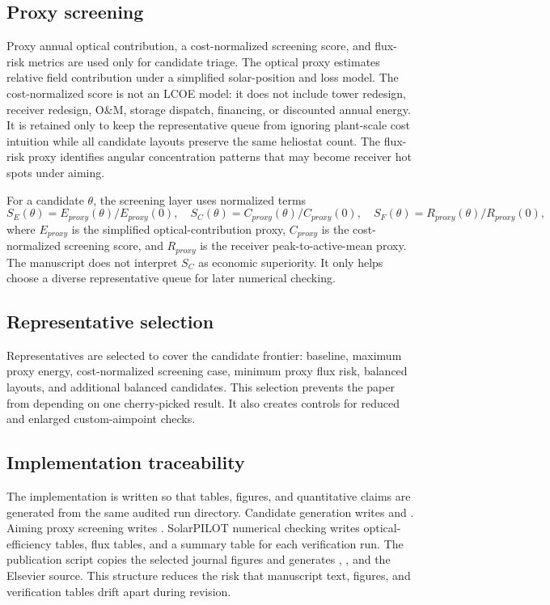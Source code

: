 \documentclass[final,3p,times]{elsarticle}
\begin{document}
\subsection{Proxy screening}
Proxy annual optical contribution, a cost-normalized screening score, and flux-risk metrics are used only for candidate triage. The optical proxy estimates relative field contribution under a simplified solar-position and loss model. The cost-normalized score is not an LCOE model: it does not include tower redesign, receiver redesign, O\&M, storage dispatch, financing, or discounted annual energy. It is retained only to keep the representative queue from ignoring plant-scale cost intuition while all candidate layouts preserve the same heliostat count. The flux-risk proxy identifies angular concentration patterns that may become receiver hot spots under aiming.

For a candidate $\theta$, the screening layer uses normalized terms
\begin{equation}
S_E(\theta)=E_{proxy}(\theta)/E_{proxy}(0),\quad
S_C(\theta)=C_{proxy}(\theta)/C_{proxy}(0),\quad
S_F(\theta)=R_{proxy}(\theta)/R_{proxy}(0),
\end{equation}
where $E_{proxy}$ is the simplified optical-contribution proxy, $C_{proxy}$ is the cost-normalized screening score, and $R_{proxy}$ is the receiver peak-to-active-mean proxy. The manuscript does not interpret $S_C$ as economic superiority. It only helps choose a diverse representative queue for later numerical checking.

\subsection{Representative selection}
Representatives are selected to cover the candidate frontier: baseline, maximum proxy energy, cost-normalized screening case, minimum proxy flux risk, balanced layouts, and additional balanced candidates. This selection prevents the paper from depending on one cherry-picked result. It also creates controls for reduced and enlarged custom-aimpoint checks.

\subsection{Implementation traceability}
The implementation is written so that tables, figures, and quantitative claims are generated from the same audited run directory. Candidate generation writes  and . Aiming proxy screening writes . SolarPILOT numerical checking writes optical-efficiency tables, flux tables, and a summary table for each verification run. The publication script copies the selected journal figures and generates , , and the Elsevier source. This structure reduces the risk that manuscript text, figures, and verification tables drift apart during revision.
\end{document}
